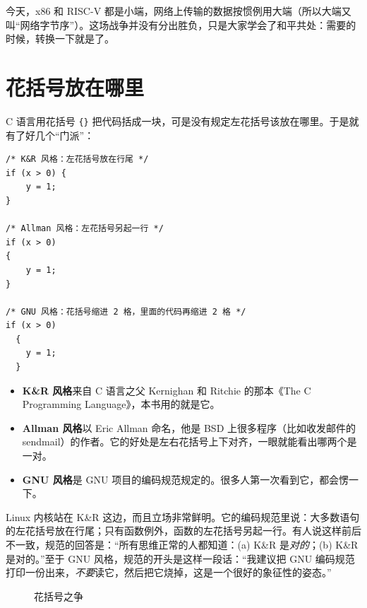 今天，x86 和 RISC-V 都是小端，网络上传输的数据按惯例用大端（所以大端又叫“网络字节序”）。这场战争并没有分出胜负，只是大家学会了和平共处：需要的时候，转换一下就是了。

\section{花括号放在哪里}

C 语言用花括号 \texttt{\{\}} 把代码括成一块，可是没有规定左花括号该放在哪里。于是就有了好几个“门派”：

\begin{verbatim}
/* K&R 风格：左花括号放在行尾 */
if (x > 0) {
    y = 1;
}

/* Allman 风格：左花括号另起一行 */
if (x > 0)
{
    y = 1;
}

/* GNU 风格：花括号缩进 2 格，里面的代码再缩进 2 格 */
if (x > 0)
  {
    y = 1;
  }
\end{verbatim}

\begin{itemize}
  \item \textbf{K\&R 风格}来自 C 语言之父 Kernighan 和 Ritchie 的那本《The C Programming Language》，本书用的就是它。
  \item \textbf{Allman 风格}以 Eric Allman 命名，他是 BSD 上很多程序（比如收发邮件的 sendmail）的作者。它的好处是左右花括号上下对齐，一眼就能看出哪两个是一对。
  \item \textbf{GNU 风格}是 GNU 项目的编码规范规定的。很多人第一次看到它，都会愣一下。
\end{itemize}

Linux 内核站在 K\&R 这边，而且立场非常鲜明。它的编码规范里说：大多数语句的左花括号放在行尾；只有函数例外，函数的左花括号另起一行。有人说这样前后不一致，规范的回答是：“所有思维正常的人都知道：(a) K\&R 是\emph{对的}；(b) K\&R 是对的。”至于 GNU 风格，规范的开头是这样一段话：“我建议把 GNU 编码规范打印一份出来，\emph{不要}读它，然后把它烧掉，这是一个很好的象征性的姿态。”

\begin{figure}[htbp]
  \centering
  \caption{花括号之争}
  \label{fig:braces}
\end{figure}

